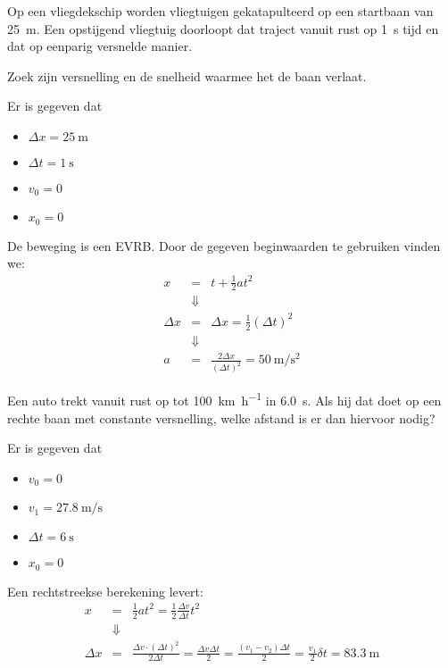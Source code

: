 \documentclass{ximera}
\begin{document}
\begin{exercise}
    Op een vliegdekschip worden vliegtuigen gekatapulteerd op een startbaan van \SI{25}{\meter}. 
    Een opstijgend vliegtuig doorloopt dat traject vanuit rust op \SI{1}{\second} tijd en dat op eenparig versnelde manier.

    Zoek zijn versnelling en de snelheid waarmee het de baan verlaat.
    \begin{oplossing}
        Er is gegeven dat
        \begin{itemize}
            \item \(\Delta x = \SI{25}{\meter}\)
            \item \(\Delta t = \SI{1}{\second}\)
            \item \(v_0 = 0\)
            \item \(x_0 = 0\)
        \end{itemize}

        De beweging is een EVRB. Door de gegeven beginwaarden te gebruiken vinden we: 
        \[
        \begin{array}{rcl}
            x &=& t + \frac{1}{2}at^2 \\ 
            &\Downarrow&\\
            \Delta x &=& \Delta x = \frac{1}{2}(\Delta t)^2 \\
            &\Downarrow&\\
            a &=& \frac{2\Delta x}{(\Delta t)^2} = \SI{50}{\meter\per\second\squared}
            
        \end{array}
        \]
    \end{oplossing}
\end{exercise}

\begin{exercise}
    Een auto trekt vanuit rust op tot \SI{100}{\kilo\meter\per\hour} in \SI{6,0}{s}. Als hij dat doet op een rechte baan met constante versnelling, welke afstand is er dan hiervoor nodig?
    \begin{oplossing}
        Er is gegeven dat 
        \begin{itemize}
            \item \(v_0 = 0\)
            \item \(v_1 = \SI{27,8}{\meter\per\second}\)
            \item \(\Delta t = \SI{6}{\second}\)
            \item \(x_0 = 0\)
        \end{itemize}
        Een rechtstreekse berekening levert: 
        \[
        \begin{array}{rcl}
            x&=& \frac{1}{2}a t^2 = \frac{1}{2}\frac{\Delta v}{\Delta t}t^2\\
            &\Downarrow&\\
            \Delta x &=& \frac{\Delta v \cdot (\Delta t)^2}{2\Delta t} = \frac{\Delta v \Delta t}{2} = \frac{(v_1 - v_2)\Delta t}{2} = \frac{v_1}{2} \delta t = \SI{83,3}{\meter}
            
        \end{array}
        \]
    \end{oplossing}
\end{exercise}
\end{document}
